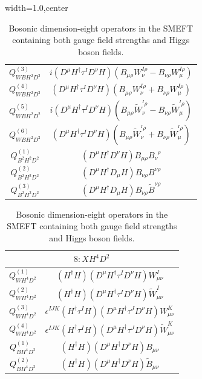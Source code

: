 \begin{table}[H]
\begin{center}
\begin{adjustbox}{width=1.0\textwidth,center}
\begin{minipage}[t]{7.8cm}
\begin{tabular}[t]{c|c}
%
$Q_{WBH^2D^2}^{(3)}$  &  $i (D^{\mu} H^{\dag} \tau^I D^{\nu} H) (B_{\mu\rho} W_{\nu}^{I \rho} - B_{\nu\rho} W_{\mu}^{I\rho})$ \\
%
$Q_{WBH^2D^2}^{(4)}$  &  $(D^{\mu} H^{\dag} \tau^I D^{\nu} H) (B_{\mu\rho} W_{\nu}^{I \rho} + B_{\nu\rho} W_{\mu}^{I\rho})$ \\
%
$Q_{WBH^2D^2}^{(5)}$  &  $i (D^{\mu} H^{\dag} \tau^I D^{\nu} H) (B_{\mu\rho} \widetilde{W}_\nu^{^I \rho} - B_{\nu\rho} \widetilde{W}_\mu^{^I \rho})$ \\
%
$Q_{WBH^2D^2}^{(6)}$  &  $(D^{\mu} H^{\dag} \tau^I D^{\nu} H) (B_{\mu\rho} \widetilde{W}_\nu^{^I \rho} + B_{\nu\rho} \widetilde{W}_\mu^{^I \rho})$ \\
%
$Q_{B^2H^2D^2}^{(1)}$  &  $(D^{\mu} H^{\dag} D^{\nu} H) B_{\mu\rho} B_{\nu}^{\,\,\,\rho}$ \\
%
$Q_{B^2H^2D^2}^{(2)}$  &  $(D^{\mu} H^{\dag} D_{\mu} H) B_{\nu\rho} B^{\nu\rho}$ \\
%
$Q_{B^2H^2D^2}^{(3)}$  &  $(D^{\mu} H^{\dag} D_{\mu} H) B_{\nu\rho} \widetilde{B}^{\nu\rho}$
\end{tabular}
\end{minipage}
\hspace{0.8cm}
\begin{minipage}[t]{6.4cm}
\renewcommand{\arraystretch}{1.5}
\begin{tabular}[t]{c|c}
\multicolumn{2}{c}{\boldmath$8:XH^4D^2$} \\
\hline
$Q_{WH^4D^2}^{(1)}$  & $(H^{\dag} H) (D^{\mu} H^{\dag} \tau^I D^{\nu} H) W_{\mu\nu}^I$ \\
%
$Q_{WH^4D^2}^{(2)}$  & $(H^{\dag} H) (D^{\mu} H^{\dag} \tau^I D^{\nu} H) \widetilde{W}_{\mu\nu}^I$ \\
%
$Q_{WH^4D^2}^{(3)}$  & $\epsilon^{IJK} (H^{\dag} \tau^I H) (D^{\mu} H^{\dag} \tau^J D^{\nu} H) W_{\mu\nu}^K$ \\
%
$Q_{WH^4D^2}^{(4)}$  & $\epsilon^{IJK} (H^{\dag} \tau^I H) (D^{\mu} H^{\dag} \tau^J D^{\nu} H) \widetilde{W}_{\mu\nu}^K$ \\
%
$Q_{BH^4D^2}^{(1)}$  & $(H^{\dag} H) (D^{\mu} H^{\dag} D^{\nu} H) B_{\mu\nu}$ \\
%
$Q_{BH^4D^2}^{(2)}$  & $(H^{\dag} H) (D^{\mu} H^{\dag} D^{\nu} H) \widetilde{B}_{\mu\nu}$
\end{tabular}
\end{minipage}
\end{adjustbox}
\end{center}
\caption{Bosonic dimension-eight operators in the SMEFT containing both gauge field strengths and Higgs boson fields.}
\label{tab:smeft8class_5_6_7_8}
\end{table}

